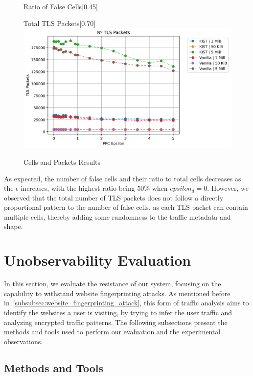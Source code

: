 \begin{figure}[htbp]
\begin{subcaptionbox}{Ratio of False Cells\label{fig:local_dummy_ratio}}[0.45\textwidth]
    \end{subcaptionbox}
    \vfill
    \begin{subcaptionbox}{Total TLS Packets\label{fig:local_packet_count}}[0.70\textwidth]
        {\includegraphics[width=\linewidth]{Chapters/Figures/Plots/local_packet_count_5mib.png}}
    \end{subcaptionbox}
    \caption{Cells and Packets Results}\label{fig:cell_packets_results}
\end{figure}

As expected, the number of false cells and their ratio to total cells decreases as the $\epsilon$ increases, with the highest ratio being $50\%$ when $epsilon_d = 0$. However, we observed that the total number of TLS packets does not follow a directly proportional pattern to the number of false cells, as each TLS packet can contain multiple cells, thereby adding some randomness to the traffic metadata and shape. 

\section{Unobservability Evaluation}\label{sec:unobservability_evaluation}

In this section, we evaluate the resistance of our system, focusing on the capability to withstand website fingerprinting attacks. As mentioned before in~\autoref{subsubsec:website_fingerprinting_attack}, this form of traffic analysis aims to identify the websites a user is visiting, by trying to infer the user traffic and analyzing encrypted traffic patterns.
The following subsections present the methods and tools used to perform our evaluation and the experimental observations.  

\subsection{Methods and Tools}\label{sec:methods_and_tools}

